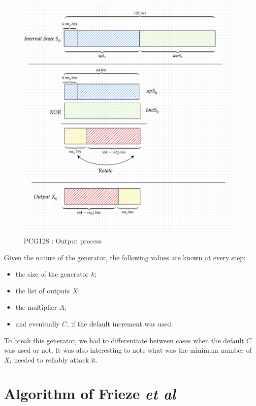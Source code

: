 \documentclass[preprint]{iacrtrans}
\begin{document}
\begin{figure}[h!]
    \centering
    \includegraphics[width=0.75\linewidth]{pictures/PCG128.png}
    \caption{PCG128 : Output process}
    \label{pcg128out}
\end{figure}



Given the nature of the generator, the following values are known at every step:
\begin{itemize}
    \item the size of the generator $k$;
    \item the list of outputs $X$;
    \item the multiplier $A$;
    \item and eventually $C$, if the default increment was used. 
\end{itemize}

To break this generator, we had to differentiate between cases when the default $C$ was used or not. It was also interesting to note what was the minimum number of $X_i$ needed to reliably attack it.





\section{Algorithm of Frieze \textit{et al}}
\end{document}
